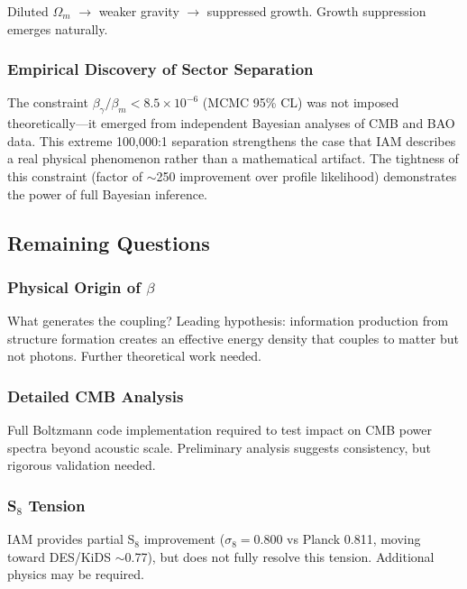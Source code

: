 \documentclass[11pt,letterpaper]{article}
\begin{document}
\noindent Diluted $\Omega_m$ $\rightarrow$ weaker gravity $\rightarrow$ suppressed growth. Growth suppression emerges naturally.

\subsubsection{Empirical Discovery of Sector Separation}

The constraint $\beta_\gamma/\beta_m < 8.5 \times 10^{-6}$ (MCMC 95\% CL) was not imposed theoretically---it emerged from independent Bayesian analyses of CMB and BAO data. This extreme 100,000:1 separation strengthens the case that IAM describes a real physical phenomenon rather than a mathematical artifact. The tightness of this constraint (factor of $\sim$250 improvement over profile likelihood) demonstrates the power of full Bayesian inference.

\subsection{Remaining Questions}

\subsubsection{Physical Origin of $\beta$}

What generates the coupling? Leading hypothesis: information production from structure formation creates an effective energy density that couples to matter but not photons. Further theoretical work needed.

\subsubsection{Detailed CMB Analysis}

Full Boltzmann code implementation required to test impact on CMB power spectra beyond acoustic scale. Preliminary analysis suggests consistency, but rigorous validation needed.

\subsubsection{S$_8$ Tension}

IAM provides partial S$_8$ improvement ($\sigma_8 = 0.800$ vs Planck 0.811, moving toward DES/KiDS $\sim$0.77), but does not fully resolve this tension. Additional physics may be required.

\end{document}
